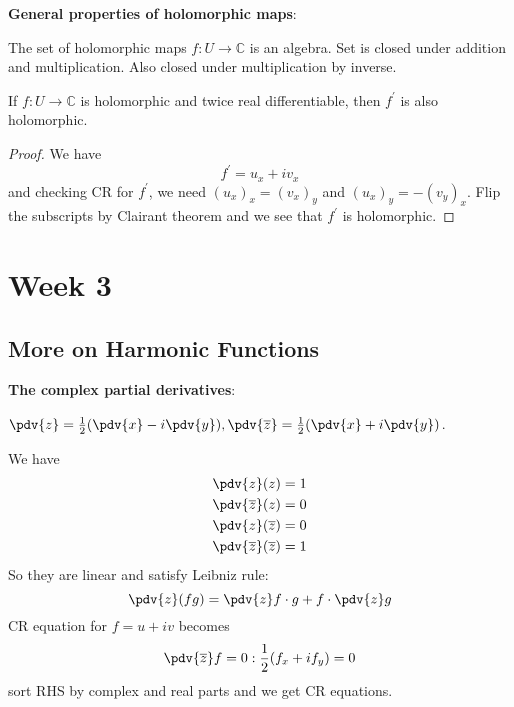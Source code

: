 \documentclass{report}
\begin{document}
\textbf{General properties of holomorphic maps}:

The set of holomorphic maps $f: U \rightarrow \mathbb{C}$ is an algebra. Set is closed under addition and multiplication. Also closed under multiplication by inverse.

\begin{theorem}{}
    If $f : U \rightarrow \mathbb{C}$ is holomorphic and twice real differentiable, then $f^{\prime}$ is also holomorphic.
\end{theorem}
    \begin{proof}
        We have 
            \begin{equation*}
                f^{\prime} = u_{x} + iv_{x}
            \end{equation*}
        and checking CR for $f^{\prime}$, we need $(u_{x})_{x} = (v_{x})_{y}$ and $(u_{x})_{y} = -(v_{y})_{x}$. Flip the subscripts by Clairant theorem and we see that $f^{\prime}$ is holomorphic.
    \end{proof}

\chapter{Week 3}

\begin{topic}
    \section{More on Harmonic Functions}
\end{topic}

\textbf{The complex partial derivatives}:
\begin{definition}{}
    $\pdv{z} = \frac{1}{2}(\pdv{x} - i \pdv{y}), \pdv{\overline{z }} = \frac{1}{2}(\pdv{x} + i\pdv{y})$.
\end{definition}

We have 
    \begin{align*}
        \pdv{z}(z)                       &= 1 \\
        \pdv{\overline{z}}(z)            &= 0 \\
        \pdv{z}(\overline{z})            &= 0 \\
        \pdv{\overline{z}}(\overline{z}) &= 1   
    \end{align*}
So they are linear and satisfy Leibniz rule:
    \begin{equation*}
        \pdv{z}(fg) = \pdv{z}f \cdot g + f \cdot \pdv{z}g
    \end{equation*}
CR equation for $f = u + iv$ becomes 
    \begin{equation*}
        \pdv{\overline{z}}f = 0 : \dfrac{1}{2}(f_{x} + if_{y}) = 0
    \end{equation*}
sort RHS by complex and real parts and we get CR equations.
\end{document}
